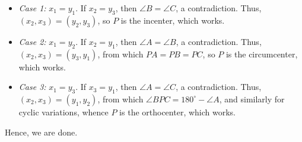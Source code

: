 \begin{itemize}
    \item \textit{Case 1:} $x_1=y_1$. If $x_2=y_3$, then $\angle B=\angle C$, a contradiction. Thus, $(x_2,x_3)=(y_2,y_3)$, so $P$ is the incenter, which works.
    \item \textit{Case 2:} $x_1=y_2$. If $x_2=y_1$, then $\angle A=\angle B$, a contradiction. Thus, $(x_2,x_3)=(y_3,y_1)$, from which $PA=PB=PC$, so $P$ is the circumcenter, which works.
    \item \textit{Case 3:} $x_1=y_3$. If $x_3=y_1$, then $\angle A=\angle C$, a contradiction. Thus, $(x_2,x_3)=(y_1,y_2)$, from which $\angle BPC=180^\circ-\angle A$, and similarly for cyclic variations, whence $P$ is the orthocenter, which works.
\end{itemize}
Hence, we are done. 

